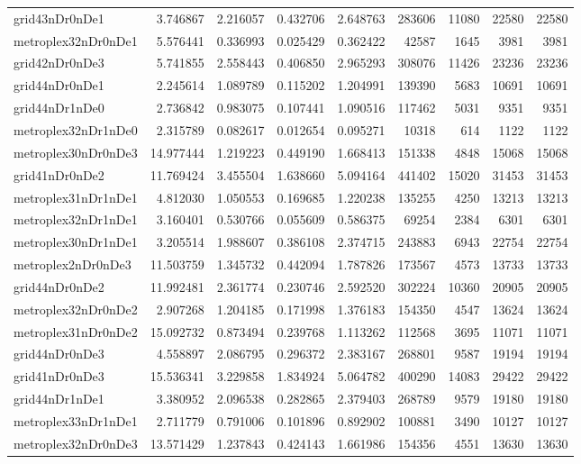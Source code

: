 \begin{longtable}{|l|r|r|r|r|r|r|r|r|}
grid43nDr0nDe1 & 3.746867 & 2.216057 & 0.432706 & 2.648763 & 283606 & 11080 & 22580 & 22580 \\
metroplex32nDr0nDe1 & 5.576441 & 0.336993 & 0.025429 & 0.362422 & 42587 & 1645 & 3981 & 3981 \\
grid42nDr0nDe3 & 5.741855 & 2.558443 & 0.406850 & 2.965293 & 308076 & 11426 & 23236 & 23236 \\
grid44nDr0nDe1 & 2.245614 & 1.089789 & 0.115202 & 1.204991 & 139390 & 5683 & 10691 & 10691 \\
grid44nDr1nDe0 & 2.736842 & 0.983075 & 0.107441 & 1.090516 & 117462 & 5031 & 9351 & 9351 \\
metroplex32nDr1nDe0 & 2.315789 & 0.082617 & 0.012654 & 0.095271 & 10318 & 614 & 1122 & 1122 \\
metroplex30nDr0nDe3 & 14.977444 & 1.219223 & 0.449190 & 1.668413 & 151338 & 4848 & 15068 & 15068 \\
grid41nDr0nDe2 & 11.769424 & 3.455504 & 1.638660 & 5.094164 & 441402 & 15020 & 31453 & 31453 \\
metroplex31nDr1nDe1 & 4.812030 & 1.050553 & 0.169685 & 1.220238 & 135255 & 4250 & 13213 & 13213 \\
metroplex32nDr1nDe1 & 3.160401 & 0.530766 & 0.055609 & 0.586375 & 69254 & 2384 & 6301 & 6301 \\
metroplex30nDr1nDe1 & 3.205514 & 1.988607 & 0.386108 & 2.374715 & 243883 & 6943 & 22754 & 22754 \\
metroplex2nDr0nDe3 & 11.503759 & 1.345732 & 0.442094 & 1.787826 & 173567 & 4573 & 13733 & 13733 \\
grid44nDr0nDe2 & 11.992481 & 2.361774 & 0.230746 & 2.592520 & 302224 & 10360 & 20905 & 20905 \\
metroplex32nDr0nDe2 & 2.907268 & 1.204185 & 0.171998 & 1.376183 & 154350 & 4547 & 13624 & 13624 \\
metroplex31nDr0nDe2 & 15.092732 & 0.873494 & 0.239768 & 1.113262 & 112568 & 3695 & 11071 & 11071 \\
grid44nDr0nDe3 & 4.558897 & 2.086795 & 0.296372 & 2.383167 & 268801 & 9587 & 19194 & 19194 \\
grid41nDr0nDe3 & 15.536341 & 3.229858 & 1.834924 & 5.064782 & 400290 & 14083 & 29422 & 29422 \\
grid44nDr1nDe1 & 3.380952 & 2.096538 & 0.282865 & 2.379403 & 268789 & 9579 & 19180 & 19180 \\
metroplex33nDr1nDe1 & 2.711779 & 0.791006 & 0.101896 & 0.892902 & 100881 & 3490 & 10127 & 10127 \\
metroplex32nDr0nDe3 & 13.571429 & 1.237843 & 0.424143 & 1.661986 & 154356 & 4551 & 13630 & 13630 \\

\end{longtable}
